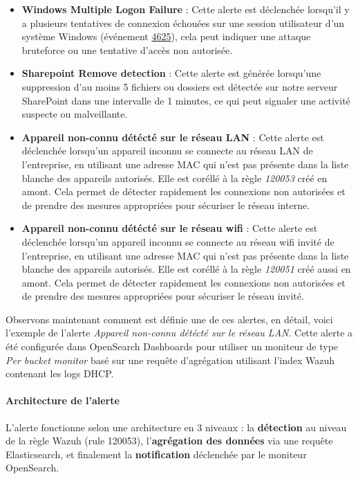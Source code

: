 \documentclass[a4paper, 11pt]{article}
\begin{document}
\begin{itemize}
  \item [$\bullet$] \textbf{Windows Multiple Logon Failure} : Cette alerte est déclenchée lorsqu'il y a plusieurs tentatives de connexion échouées sur une session utilisateur d'un système Windows (événement \href{https://learn.microsoft.com/en-us/windows/security/threat-protection/auditing/event-4625}{4625}), cela peut indiquer une attaque bruteforce ou une tentative d'accès non autorisée.
  \item [$\bullet$] \textbf{Sharepoint Remove detection} : Cette alerte est générée lorsqu'une suppression d'au moins 5 fichiers ou dossiers est détectée sur notre serveur SharePoint dans une intervalle de 1 minutes, ce qui peut signaler une activité suspecte ou malveillante.
  \item [$\bullet$] \textbf{Appareil non-connu détécté sur le réseau LAN} : Cette alerte est déclenchée lorsqu'un appareil inconnu se connecte au réseau LAN de l'entreprise, en utilisant une adresse MAC qui n'est pas présente dans la liste blanche des appareils autorisés. Elle est coréllé à la règle \textit{120053} créé en amont. Cela permet de détecter rapidement les connexions non autorisées et de prendre des mesures appropriées pour sécuriser le réseau interne.
  \item [$\bullet$] \textbf{Appareil non-connu détécté sur le réseau wifi} : Cette alerte est déclenchée lorsqu'un appareil inconnu se connecte au réseau wifi invité de l'entreprise, en utilisant une adresse MAC qui n'est pas présente dans la liste blanche des appareils autorisés. Elle est coréllé à la règle \textit{120051} créé aussi en amont. Cela permet de détecter rapidement les connexions non autorisées et de prendre des mesures appropriées pour sécuriser le réseau invité.
\end{itemize}
\par\bigskip
Observons maintenant comment est définie une de ces alertes, en détail, voici l'exemple de l'alerte \textit{Appareil non-connu détécté sur le réseau LAN}. Cette alerte a été configurée dans OpenSearch Dashboards pour utiliser un moniteur de type \textit{Per bucket monitor} basé sur une requête d'agrégation utilisant l'index Wazuh contenant les logs DHCP.

\paragraph{Architecture de l'alerte}

L'alerte fonctionne selon une architecture en 3 niveaux : la \textbf{détection} au niveau de la règle Wazuh (rule 120053), l'\textbf{agrégation des données} via une requête Elasticsearch, et finalement la \textbf{notification} déclenchée par le moniteur OpenSearch.
\par\bigskip
\end{document}
